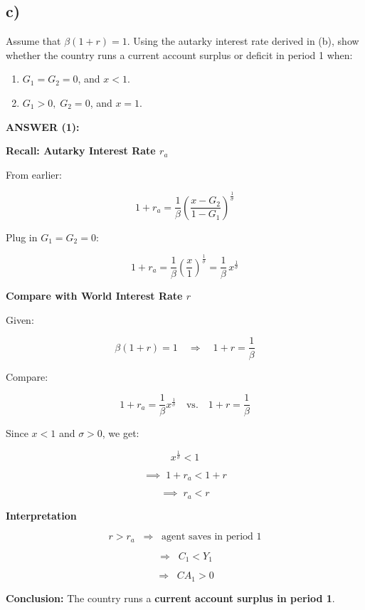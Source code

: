 \documentclass[12pt]{article}
\begin{document}
\subsection*{\noindent\textbf{c)}}

Assume that \( \beta(1+r) = 1 \). Using the autarky interest rate derived in (b), show whether the country runs a current account surplus or deficit in period 1 when:  

\begin{enumerate}
    \item \( G_1 = G_2 = 0 \), and \( x < 1 \).
    \item \( G_1 > 0, \; G_2 = 0 \), and \( x = 1 \).
\end{enumerate}

\vspace{0.5em}
\noindent\textcolor{formalred}{\textbf{ANSWER (1):}}

\textbf{Recall: Autarky Interest Rate \( r_a \)}

From earlier:

\[
1+r_a = \frac{1}{\beta} \left( \frac{x-G_2}{1-G_1} \right)^{\tfrac{1}{\sigma}}
\]

Plug in \( G_1 = G_2 = 0 \):

\[
1+r_a = \frac{1}{\beta} \left( \frac{x}{1} \right)^{\tfrac{1}{\sigma}}
= \frac{1}{\beta} \, x^{\tfrac{1}{\sigma}}
\]

\textbf{Compare with World Interest Rate \( r \)}

Given:

\[
\beta(1+r) = 1 \quad \Rightarrow \quad 1+r = \frac{1}{\beta}
\]

Compare:

\[
1+r_a = \frac{1}{\beta} x^{\tfrac{1}{\sigma}}
\quad \text{vs.} \quad
1+r = \frac{1}{\beta}
\]

Since \( x < 1 \) and \( \sigma > 0 \), we get:

\[
x^{\tfrac{1}{\sigma}} < 1
\]

\[
\implies \; 1+r_a < 1+r
\]

\[
\implies \; r_a < r
\]


\textbf{Interpretation}

\[
r > r_a \;\; \Rightarrow \;\; \text{agent saves in period 1}
\]

\[
\Rightarrow \;\; C_1 < Y_1
\]

\[
\Rightarrow \;\; CA_1 > 0
\]

\textbf{Conclusion:} The country runs a \textbf{current account surplus in period 1}.
\end{document}
